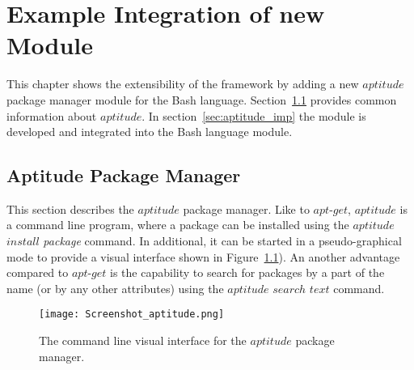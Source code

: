 
\chapter{Example Integration of new Module}\label{chap:add}
This chapter shows the extensibility of the framework by adding a new $aptitude$ package manager module for the Bash language. %
Section~\ref{sec:aptitude} provides common information about $aptitude$. %
In section~\ref{sec:aptitude_imp} the module is developed and integrated into the Bash language module.

\section{Aptitude Package Manager}\label{sec:aptitude}
This section describes the $aptitude$ package manager.
Like to $apt$-$get$, $aptitude$ is a command line program, where a package can be installed using the $aptitude$ $install$ \emph{package} command. 
In additional, it can be started in a pseudo-graphical mode to provide a visual interface shown in Figure~\ref{fig:aptitude_gui}).
An another advantage compared to $apt$-$get$ is the capability to search for packages by a part of the name (or by any other attributes) using the $aptitude$ $search$ $text$ command.
\begin{figure}[ht]   
	\centering
	\texttt{[image: Screenshot\_aptitude.png]}
	\caption{The command line visual interface for the $aptitude$ package manager.}
	\label{fig:aptitude_gui}
\end{figure}

